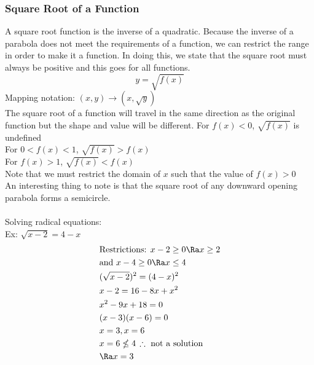 \subsubsection{Square Root of a Function}
A square root function is the inverse of a quadratic. Because the inverse of a parabola does not meet the requirements of a function, we can restrict the range in order to make it a function. In doing this, we state that the square root must always be positive and this goes for all functions.
$$y=\sqrt{f(x)}$$
Mapping notation: $(x,y)\rightarrow(x,\sqrt{y})$\\
The square root of a function will travel in the same direction as the original function but the shape and value will be different.
For $f(x)<0$, $\sqrt{f(x)}$ is undefined\\
For $0<f(x)<1$, $\sqrt{f(x)}>f(x)$\\
For $f(x)>1$, $\sqrt{f(x)}<f(x)$\\
Note that we must restrict the domain of $x$ such that the value of $f(x)>0$\\
An interesting thing to note is that the square root of any downward opening parabola forms a semicircle.\\
\\
Solving radical equations:\\
Ex: $\sqrt{x-2}=4-x$
\begin{align*}
    &\text{Restrictions: }x-2\geq 0\Ra x\geq 2\\
    &\text{and }x-4\geq 0\Ra x\leq 4\\
    &(\sqrt{x-2})^2=(4-x)^2\\
    &x-2=16-8x+x^2\\
    &x^2-9x+18=0\\
    &(x-3)(x-6)=0\\
    &x=3,x=6\\
    &x=6\nleq 4\,\therefore \text{ not a solution}\\
    &\Ra x=3
\end{align*}
